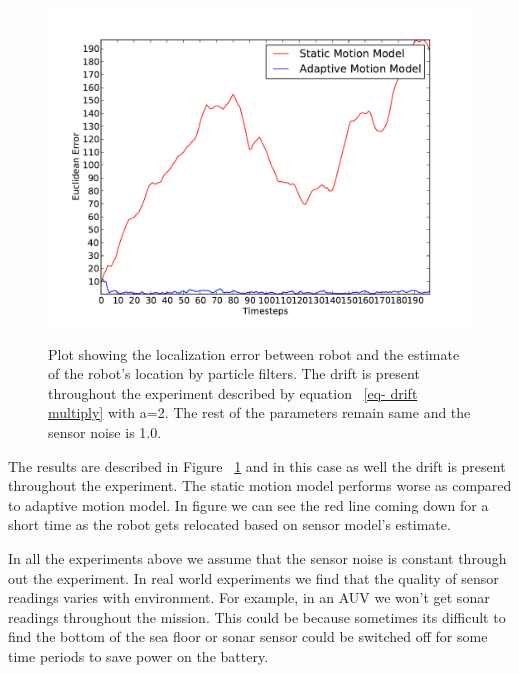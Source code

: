 \documentclass[12pt]{dalcsthesis}
\begin{document}
\begin{figure}[!ht]
  \centering
     {\includegraphics[height = 3.0 in]{./plots/200_005_005_s_10_traj_3_drift_20_multiply.pdf}}
  \caption{\label{fig-drift_multiply} Plot showing the localization error between robot and the estimate of the robot's location by particle filters. The drift is present throughout the experiment described by equation ~\ref{eq- drift multiply} with a=2. The rest of the parameters remain same and the sensor noise is 1.0. }
\end{figure}

The results are described in Figure ~\ref{fig-drift_multiply} and in this case as well the drift is present throughout the experiment. The static motion model performs worse as compared to adaptive motion model. In figure we can see the red line coming down for a short time as the robot gets relocated based on sensor model's estimate.     


In all the experiments above we assume that the sensor noise is constant through out the experiment. In real world experiments we find that the quality of sensor readings varies with environment. For example, in an AUV we won't get sonar readings throughout the mission. This could be because sometimes its difficult to find the bottom of the sea floor or sonar sensor could be switched off for some time periods to save power on the battery.
\end{document}
